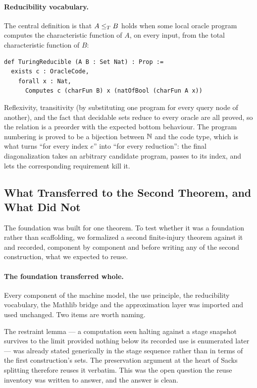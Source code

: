 \paragraph{Reducibility vocabulary.}
The central definition is that $A \leq_T B$ holds when some local oracle
program computes the characteristic function of $A$, on every input, from
the total characteristic function of $B$:

\begin{lstlisting}
def TuringReducible (A B : Set Nat) : Prop :=
  exists c : OracleCode,
    forall x : Nat,
      Computes c (charFun B) x (natOfBool (charFun A x))
\end{lstlisting}

Reflexivity, transitivity (by substituting one program for every query node
of another), and the fact that decidable sets reduce to every oracle are
all proved, so the relation is a preorder with the expected bottom
behaviour.  The program numbering is proved to be a bijection between $\mathbb{N}$
and the code type, which is what turns ``for every index $e$'' into ``for
every reduction'': the final diagonalization takes an arbitrary candidate
program, passes to its index, and lets the corresponding requirement kill
it.

\subsection{What Transferred to the Second Theorem, and What Did Not}
\label{sec:transfer}

The foundation was built for one theorem.  To test whether it was a
foundation rather than scaffolding, we formalized a second finite-injury
theorem against it and recorded, component by component and before writing
any of the second construction, what we expected to reuse.

\paragraph{The foundation transferred whole.}
Every component of the machine model, the use principle, the reducibility
vocabulary, the Mathlib bridge and the approximation layer was imported and
used unchanged.  Two items are worth naming.

The restraint lemma --- a computation seen halting against a stage snapshot
survives to the limit provided nothing below its recorded use is enumerated
later --- was already stated generically in the stage sequence rather than
in terms of the first construction's sets.  The preservation argument at
the heart of Sacks splitting therefore reuses it verbatim.  This was the
open question the reuse inventory was written to answer, and the answer is
clean.

